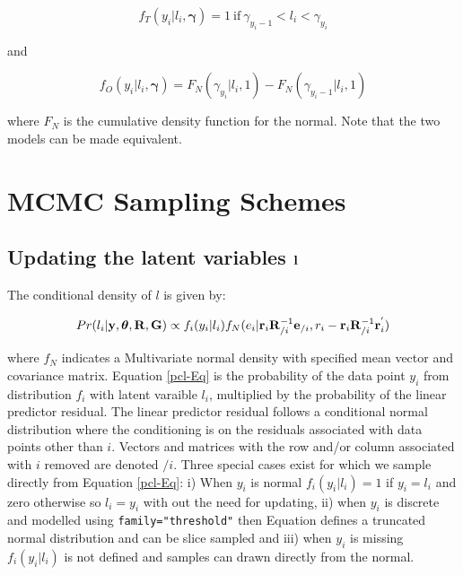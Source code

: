 \documentclass{article}
\begin{document}
\begin{equation}
f_{T}(y_{i} | l_{i}, {\bm \gamma}) = 1\ \textrm{if}\ \gamma_{y_{i}-1} <  l_{i} < \gamma_{y_{i}}
\end{equation}

and

\begin{equation}
f_{O}(y_{i} | l_{i}, {\bm \gamma}) = F_{N}(\gamma_{y_{i}} | l_{i}, 1)-F_{N}(\gamma_{y_{i}-1} | l_{i},1)
\end{equation}  

where $F_{N}$ is the cumulative density function for the normal. Note that the two models can be made equivalent.

\section{MCMC Sampling Schemes}
\label{MCMC-app}

\subsection[Updating the latent variables]{Updating the latent variables ${\bf l}$}

The conditional density of $l$ is given by:

\begin{equation}
Pr(l_{i}| {\bf y}, {\bm \theta}, {\bf R}, {\bf G}) \propto  f_{i}(y_{i} | l_{i})f_{N}(e_{i}|{\bf r}_{i}{\bf R}_{/i}^{-1}{\bf e}_{/i}, r_{i}-{\bf r}_{i}{\bf R}_{/i}^{-1}{\bf r}^{'}_{i})
\label{pcl-Eq}
\end{equation}

where $f_{N}$ indicates a Multivariate normal density with specified mean vector and covariance matrix.  Equation \ref{pcl-Eq} is the probability of the data point $y_{i}$ from distribution $f_{i}$ with latent varaible $l_{i}$, multiplied by the probability of the linear predictor residual. The linear predictor residual follows a conditional normal distribution where the conditioning is on the residuals associated with data points other than $i$. Vectors and matrices with the row and/or column associated with $i$ removed are denoted $/i$.  Three special cases exist for which we sample directly from Equation \ref{pcl-Eq}: i) When $y_{i}$ is normal $f_{i}(y_{i} | l_{i})=1$ if $y_{i}=l_{i}$ and zero otherwise so $l_{i}=y_{i}$ with out the need for updating, ii) when $y_{i}$ is discrete and modelled using \texttt{family="threshold"} then Equation \label{pcl-Eq} defines a truncated normal distribution and can be slice sampled \citep{Robert.1995} and iii) when $y_{i}$ is missing $f_{i}(y_{i} | l_{i})$ is not defined and samples can drawn directly from the normal.
\\
\end{document}
